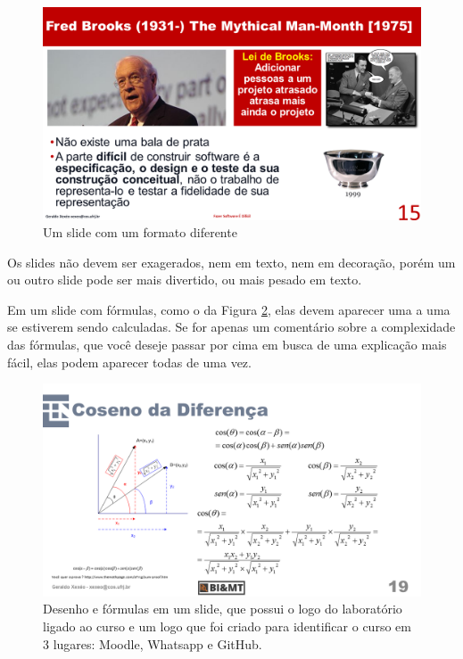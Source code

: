 \documentclass{article}
\def\tam{0.6}
\begin{document}
\begin{figure}[htb]
    \centering
    \includegraphics[width=\tam\linewidth]{imagens/manmonth.png}
    \caption{Um slide com um formato diferente}
    \label{fig:man}
\end{figure}


Os slides não devem ser exagerados, nem em texto, nem em decoração, porém um ou outro slide pode ser mais divertido, ou mais pesado em texto. 

Em um slide com fórmulas, como o da Figura \ref{fig:formulas}, elas devem aparecer uma a uma se estiverem sendo calculadas. Se for apenas um comentário sobre a complexidade das fórmulas, que você deseje passar por cima em busca de uma explicação mais fácil, elas podem aparecer todas de uma vez.

\begin{figure}[hbt]
    \centering
    \includegraphics[width=\tam\linewidth]{imagens/desenhoeformulas.png}
    \caption{Desenho e fórmulas em um slide, que possui o logo do laboratório ligado ao curso e um logo que foi criado para identificar o curso em 3 lugares: Moodle, Whatsapp e GitHub.}
    \label{fig:formulas}
\end{figure}
\end{document}
